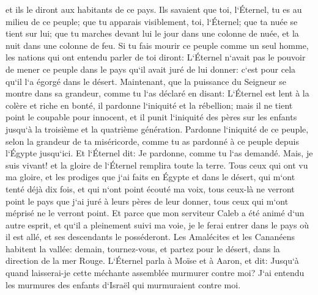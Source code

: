 \verse et ils le diront aux habitants de ce pays. Ils savaient que toi, l`Éternel, tu es au milieu de ce peuple; que tu apparais visiblement, toi, l`Éternel; que ta nuée se tient sur lui; que tu marches devant lui le jour dans une colonne de nuée, et la nuit dans une colonne de feu. 
\verse Si tu fais mourir ce peuple comme un seul homme, les nations qui ont entendu parler de toi diront: 
\verse L`Éternel n`avait pas le pouvoir de mener ce peuple dans le pays qu`il avait juré de lui donner: c`est pour cela qu`il l`a égorgé dans le désert. 
\verse Maintenant, que la puissance du Seigneur se montre dans sa grandeur, comme tu l`as déclaré en disant: 
\verse L`Éternel est lent à la colère et riche en bonté, il pardonne l`iniquité et la rébellion; mais il ne tient point le coupable pour innocent, et il punit l`iniquité des pères sur les enfants jusqu`à la troisième et la quatrième génération. 
\verse Pardonne l`iniquité de ce peuple, selon la grandeur de ta miséricorde, comme tu as pardonné à ce peuple depuis l`Égypte jusqu`ici. 
\verse Et l`Éternel dit: Je pardonne, comme tu l`as demandé. 
\verse Mais, je suis vivant! et la gloire de l`Éternel remplira toute la terre. 
\verse Tous ceux qui ont vu ma gloire, et les prodiges que j`ai faits en Égypte et dans le désert, qui m`ont tenté déjà dix fois, et qui n`ont point écouté ma voix, 
\verse tous ceux-là ne verront point le pays que j`ai juré à leurs pères de leur donner, tous ceux qui m`ont méprisé ne le verront point. 
\verse Et parce que mon serviteur Caleb a été animé d`un autre esprit, et qu`il a pleinement suivi ma voie, je le ferai entrer dans le pays où il est allé, et ses descendants le posséderont. 
\verse Les Amalécites et les Cananéens habitent la vallée: demain, tournez-vous, et partez pour le désert, dans la direction de la mer Rouge. 
\verse L`Éternel parla à Moïse et à Aaron, et dit: 
\verse Jusqu`à quand laisserai-je cette méchante assemblée murmurer contre moi? J`ai entendu les murmures des enfants d`Israël qui murmuraient contre moi. 
